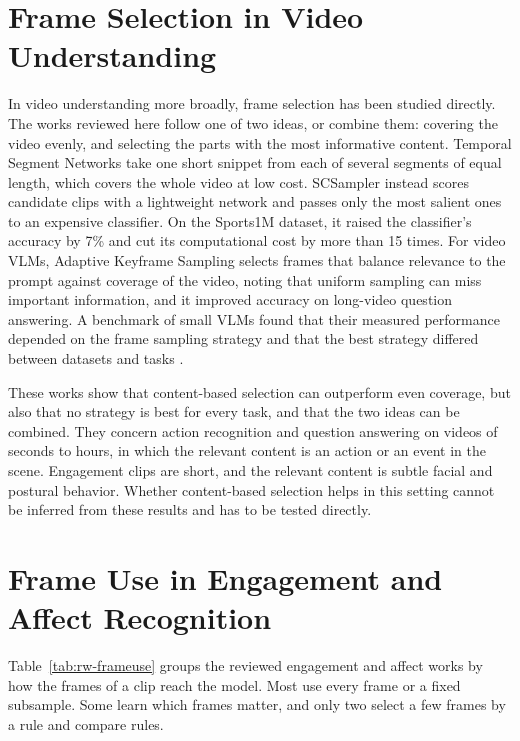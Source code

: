 
\section{Frame Selection in Video Understanding}
\label{sec:rw-sampling}

In video understanding more broadly, frame selection has been studied directly. The works reviewed here follow one of two ideas, or combine them: covering the video evenly, and selecting the parts with the most informative content. Temporal Segment Networks \cite{wang2016} take one short snippet from each of several segments of equal length, which covers the whole video at low cost. SCSampler \cite{korbar2019} instead scores candidate clips with a lightweight network and passes only the most salient ones to an expensive classifier. On the Sports1M dataset, it raised the classifier's accuracy by 7\% and cut its computational cost by more than 15 times. For video VLMs, Adaptive Keyframe Sampling \cite{tang2025aks} selects frames that balance relevance to the prompt against coverage of the video, noting that uniform sampling can miss important information, and it improved accuracy on long-video question answering. A benchmark of small VLMs found that their measured performance depended on the frame sampling strategy and that the best strategy differed between datasets and tasks \cite{brkic2025}.

These works show that content-based selection can outperform even coverage, but also that no strategy is best for every task, and that the two ideas can be combined. They concern action recognition and question answering on videos of seconds to hours, in which the relevant content is an action or an event in the scene. Engagement clips are short, and the relevant content is subtle facial and postural behavior. Whether content-based selection helps in this setting cannot be inferred from these results and has to be tested directly.



\section{Frame Use in Engagement and Affect Recognition}
\label{sec:rw-frameuse}

Table~\ref{tab:rw-frameuse} groups the reviewed engagement and affect works by how the frames of a clip reach the model. Most use every frame or a fixed subsample. Some learn which frames matter, and only two select a few frames by a rule and compare rules.

